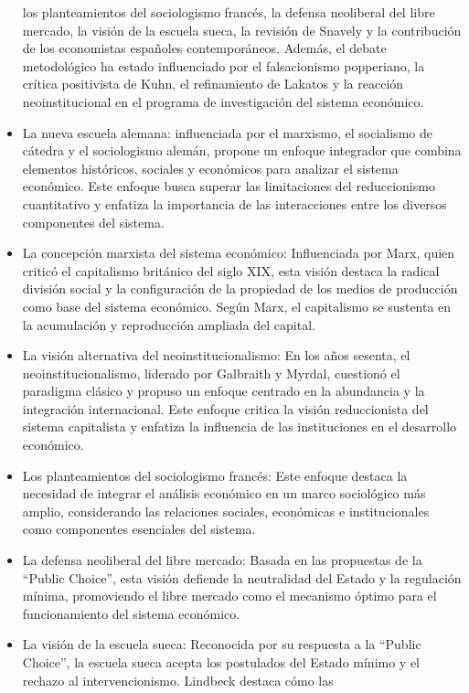 \documentclass[12pt]{book} %
\begin{document}
\begin{itemize}
  los planteamientos del sociologismo francés, la defensa neoliberal del
  libre mercado, la visión de la escuela sueca, la revisión de Snavely y
  la contribución de los economistas españoles contemporáneos. Además,
  el debate metodológico ha estado influenciado por el falsacionismo
  popperiano, la crítica positivista de Kuhn, el refinamiento de Lakatos
  y la reacción neoinstitucional en el programa de investigación del
  sistema económico.
\item
  La nueva escuela alemana: influenciada por el marxismo, el socialismo
  de cátedra y el sociologismo alemán, propone un enfoque integrador que
  combina elementos históricos, sociales y económicos para analizar el
  sistema económico. Este enfoque busca superar las limitaciones del
  reduccionismo cuantitativo y enfatiza la importancia de las
  interacciones entre los diversos componentes del sistema.
\item
  La concepción marxista del sistema económico: Influenciada por Marx,
  quien criticó el capitalismo británico del siglo XIX, esta visión
  destaca la radical división social y la configuración de la propiedad
  de los medios de producción como base del sistema económico. Según
  Marx, el capitalismo se sustenta en la acumulación y reproducción
  ampliada del capital.
\item
  La visión alternativa del neoinstitucionalismo: En los años sesenta,
  el neoinstitucionalismo, liderado por Galbraith y Myrdal, cuestionó el
  paradigma clásico y propuso un enfoque centrado en la abundancia y la
  integración internacional. Este enfoque critica la visión
  reduccionista del sistema capitalista y enfatiza la influencia de las
  instituciones en el desarrollo económico.
\item
  Los planteamientos del sociologismo francés: Este enfoque destaca la
  necesidad de integrar el análisis económico en un marco sociológico
  más amplio, considerando las relaciones sociales, económicas e
  institucionales como componentes esenciales del sistema.
\item
  La defensa neoliberal del libre mercado: Basada en las propuestas de
  la ``Public Choice'', esta visión defiende la neutralidad del Estado y
  la regulación mínima, promoviendo el libre mercado como el mecanismo
  óptimo para el funcionamiento del sistema económico.
\item
  La visión de la escuela sueca: Reconocida por su respuesta a la
  ``Public Choice'', la escuela sueca acepta los postulados del Estado
  mínimo y el rechazo al intervencionismo. Lindbeck destaca cómo las

\end{itemize}
\end{document}
